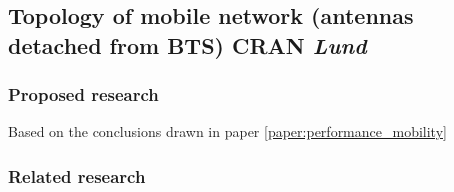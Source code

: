 \subsection{Topology of mobile network (antennas detached from BTS) CRAN \emph{Lund}}
\subsubsection{Proposed research}
Based on the conclusions drawn in paper \ref{paper:performance_mobility}
\subsubsection{Related research}